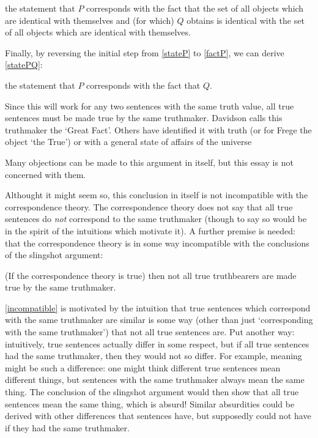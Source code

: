 	\begin{example} \label{factQ}
	the statement that $P$ corresponds with the fact that the set of all objects which are identical with themselves and (for which) $Q$ obtains is identical with the set of all objects which are identical with themselves.
	\end{example}

Finally, by reversing the initial step from \ref{stateP} to \ref{factP}, we can derive \ref{statePQ}:

	\begin{example} \label{statePQ}
	the statement that $P$ corresponds with the fact that $Q$.
	\end{example}

Since this will work for any two sentences with the same truth value, all true sentences must be made true by the same truthmaker.
Davidson calls this truthmaker the `Great Fact'.
\parencite[753]{Davidson_1969}
Others have identified it with truth (or for Frege the object `the True'\parencite[216]{Frege_1948}) or with a general state of affairs of the universe %

Many objections can be made to this argument in itself, but this essay is not concerned with them.

Althought it might seem so, this conclusion in itself is not incompatible with the correspondence theory.
The correspondence theory does not say that all true sentences do \emph{not} correspond to the same truthmaker (though to say so would be in the spirit of the intuitions which motivate it).
A further premise is needed: that the correspondence theory is in some way incompatible with the conclusions of the slingshot argument:

	\begin{thesis} \label{incompatible}
	(If the correspondence theory is true) then not all true truthbearers are made true by the same truthmaker.
	\end{thesis}

\ref{incompatible} is motivated by the intuition that true sentences which correspond with the same truthmaker are similar is some way (other than just `corresponding with the same truthmaker') that not all true sentences are.
Put another way: intuitively, true sentences actually differ in some respect, but if all true sentences had the same truthmaker, then they would not so differ.
For example, meaning might be such a difference: one might think different true sentences mean different things, but sentences with the same truthmaker always mean the same thing.
The conclusion of the slingshot argument would then show that all true sentences mean the same thing, which is absurd!
Similar absurdities could be derived with other differences that sentences have, but supposedly could not have if they had the same truthmaker.

